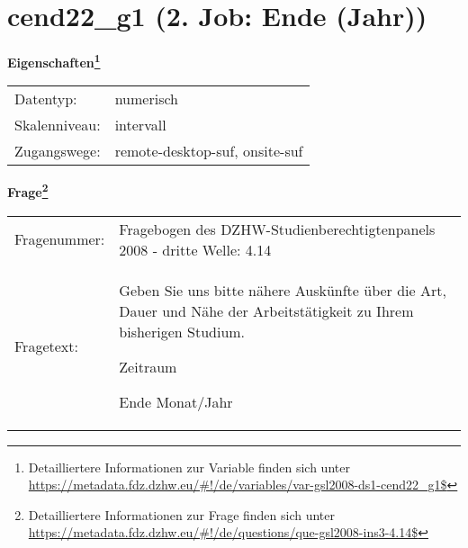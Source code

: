 
    \setcounter{footnote}{0}

    \vspace*{-1.8cm}
	\section{cend22\_g1 (2. Job: Ende (Jahr))}
	\label{section:cend22_g1}



    \vspace*{0.5cm}
    \noindent\textbf{Eigenschaften\footnote{Detailliertere Informationen zur Variable finden sich unter
		\url{https://metadata.fdz.dzhw.eu/\#!/de/variables/var-gsl2008-ds1-cend22_g1$}}}\\
	\begin{tabularx}{\hsize}{@{}lX}
	Datentyp: & numerisch \\
	Skalenniveau: & intervall \\
	Zugangswege: &
	  remote-desktop-suf, 
	  onsite-suf
 \\
    \end{tabularx}



				\vspace*{0.5cm}
                \noindent\textbf{Frage\footnote{Detailliertere Informationen zur Frage finden sich unter
		              \url{https://metadata.fdz.dzhw.eu/\#!/de/questions/que-gsl2008-ins3-4.14$}}}\\
				\begin{tabularx}{\hsize}{@{}lX}
					Fragenummer: &
					  Fragebogen des DZHW-Studienberechtigtenpanels 2008 - dritte Welle:
					  4.14
 \\
					Fragetext: & Geben Sie uns bitte nähere Auskünfte über die Art, Dauer und Nähe der Arbeitstätigkeit zu Ihrem bisherigen Studium.\par  Zeitraum\par  Ende Monat/Jahr \\
				\end{tabularx}





